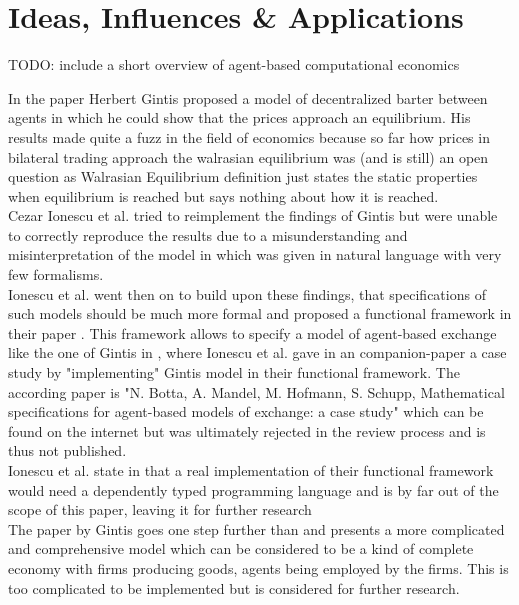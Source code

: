 \documentclass{article}
\begin{document}

\section{Ideas, Influences \& Applications}

TODO: include a short overview of agent-based computational economics 

In the paper \cite{Gintis2006} Herbert Gintis proposed a model of decentralized barter between agents in which he could show that the prices approach an equilibrium. His results made quite a fuzz in the field of economics because so far how prices in bilateral trading approach the walrasian equilibrium was (and is still) an open question as Walrasian Equilibrium definition just states the static properties when equilibrium is reached but says nothing about how it is reached. \\
Cezar Ionescu et al. tried to reimplement the findings of Gintis but were unable to correctly reproduce the results due to a misunderstanding and misinterpretation of the model in \cite{Gintis2006} which was given in natural language with very few formalisms. \\
Ionescu et al. went then on to build upon these findings, that specifications of such models should be much more formal and proposed a functional framework in their paper \cite{Botta20114025}. This framework allows to specify a model of agent-based exchange like the one of Gintis in \cite{Gintis2006}, where Ionescu et al. gave in an companion-paper a case study by "implementing" Gintis model in their functional framework. The according paper is "N. Botta, A. Mandel, M. Hofmann, S. Schupp, Mathematical specifications for agent-based models of exchange: a case study" which can be found on the internet but was ultimately rejected in the review process and is thus not published. \\
Ionescu et al. state in \cite{Botta20114025} that a real implementation of their functional framework would need a dependently typed programming language and is by far out of the scope of this paper, leaving it for further research \\
The paper \cite{gintis_dynamics_2007} by Gintis goes one step further than \cite{Gintis2006} and presents a more complicated and comprehensive model which can be considered to be a kind of complete economy with firms producing goods, agents being employed by the firms. This is too complicated to be implemented but is considered for further research.\\
\end{document}
